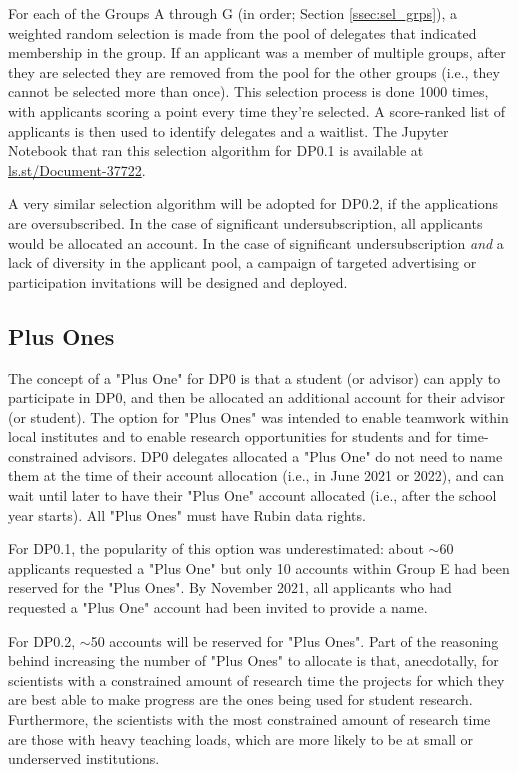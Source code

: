 \documentclass[DM,lsstdraft,authoryear,toc]{lsstdoc}
\begin{document}
For each of the Groups A through G (in order; Section \ref{ssec:sel_grps}), a weighted random selection is made from the pool of delegates that indicated membership in the group.
If an applicant was a member of multiple groups, after they are selected they are removed from the pool for the other groups (i.e., they cannot be selected more than once).
This selection process is done 1000 times, with applicants scoring a point every time they're selected.
A score-ranked list of applicants is then used to identify delegates and a waitlist.
The Jupyter Notebook that ran this selection algorithm for DP0.1 is available at \url{ls.st/Document-37722}.

A very similar selection algorithm will be adopted for DP0.2, if the applications are oversubscribed.
In the case of significant undersubscription, all applicants would be allocated an account.
In the case of significant undersubscription {\it and} a lack of diversity in the applicant pool, a campaign of targeted advertising or participation invitations will be designed and deployed.


\subsection{Plus Ones}\label{ssec:sel_po}

The concept of a "Plus One" for DP0 is that a student (or advisor) can apply to participate in DP0, and then be allocated an additional account for their advisor (or student).
The option for "Plus Ones" was intended to enable teamwork within local institutes and to enable research opportunities for students and for time-constrained advisors.
DP0 delegates allocated a "Plus One" do not need to name them at the time of their account allocation (i.e., in June 2021 or 2022), and can wait until later to have their "Plus One" account allocated (i.e., after the school year starts).
All "Plus Ones" must have Rubin data rights.

For DP0.1, the popularity of this option was underestimated: about $\sim$60 applicants requested a "Plus One" but only 10 accounts within Group E had been reserved for the "Plus Ones". 
By November 2021, all applicants who had requested a "Plus One" account had been invited to provide a name.

For DP0.2, $\sim$50 accounts will be reserved for "Plus Ones".
Part of the reasoning behind increasing the number of "Plus Ones" to allocate is that, anecdotally, for scientists with a constrained amount of research time the projects for which they are best able to make progress are the ones being used for student research. 
Furthermore, the scientists with the most constrained amount of research time are those with heavy teaching loads, which are more likely to be at small or underserved institutions.
\end{document}
